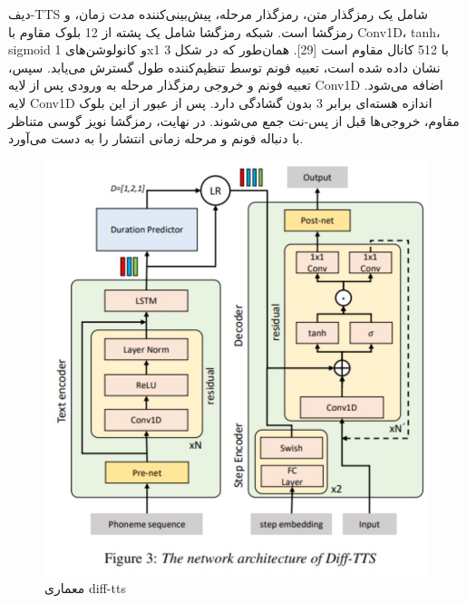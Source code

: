 \documentclass[fleqn]{report}
\begin{document}
دیف-TTS شامل یک رمزگذار متن، رمزگذار مرحله، پیش‌بینی‌کننده مدت زمان، و رمزگشا است. 
شبکه رمزگشا شامل یک پشته از 12 بلوک مقاوم با Conv1D، tanh، sigmoid و کانولوشن‌های 1x1 با 512 کانال مقاوم است [29]. همان‌طور که در شکل 3 نشان داده شده است، تعبیه فونم توسط تنظیم‌کننده طول گسترش می‌یابد. سپس، تعبیه فونم و خروجی رمزگذار مرحله به ورودی پس از لایه Conv1D اضافه می‌شود. لایه Conv1D اندازه هسته‌ای برابر 3 بدون گشادگی دارد. پس از عبور از این بلوک مقاوم، خروجی‌ها قبل از پس-نت جمع می‌شوند. در نهایت، رمزگشا نویز گوسی متناظر با دنباله فونم و مرحله زمانی انتشار را به دست می‌آورد.

\begin{figure}[h]

    \centering
    \includegraphics[width=.8\textwidth, keepaspectratio]{images/diff-tts.jpg}
    
    \caption{معماری diff-tts}
    \label{fig:diff-tts}
\end{figure}
\end{document}
